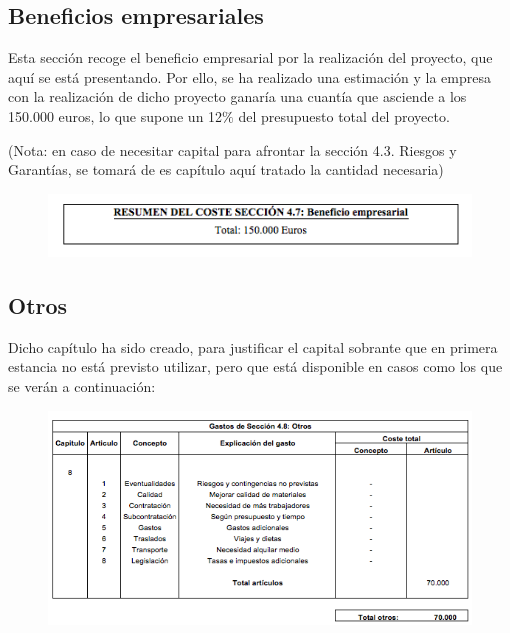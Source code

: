 \documentclass[12pt,oneside,a4paper]{article}
\numberwithin{figure}{section}
\begin{document}
\subsection{Beneficios empresariales}

Esta sección recoge el beneficio empresarial por la realización del proyecto, que aquí se está presentando. Por ello, se ha realizado una estimación y la empresa con la realización de dicho proyecto ganaría una cuantía que asciende a los 150.000 euros, lo que supone un 12$\%$ del presupuesto total del proyecto.

(Nota: en caso de necesitar capital para afrontar la sección 4.3. Riesgos y Garantías, se tomará de es capítulo aquí tratado la cantidad necesaria)

\begin{figure}[H]
\begin{center}
\includegraphics[scale=.8]{Beneficios.png}
\end{center}
\end{figure}


\subsection{Otros}

Dicho capítulo ha sido creado, para justificar el capital sobrante que en primera estancia no está previsto utilizar, pero que está disponible en casos como los que se verán a continuación:

\begin{figure}[H]
\begin{center}
\includegraphics[scale=.8]{Otros.png}
\end{center}
\end{figure}
\end{document}
